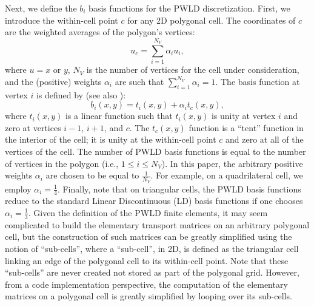 \documentclass[preprint,10pt]{elsarticle}
\renewcommand{\(}{\left(}
\renewcommand{\)}{\right)}
\renewcommand{\[}{\left[}
\renewcommand{\]}{\right]}
\newcommand{\tf}{b_i}
\begin{document}
Next, we define the $\tf$ basis functions for the PWLD discretization. First, we
introduce the within-cell point $c$ for any 2D polygonal cell. The coordinates 
of $c$ are the weighted averages of the polygon's vertices:
\begin{equation}
  u_c = \sum_{i=1}^{N_V} \alpha_i u_i,
\end{equation}
where $u=x$ or $y$, $N_V$ is the number of vertices for the cell under
consideration, and the (positive) weights $\alpha_i$ are such that $\sum_{i=1}^{N_V} \alpha_i =1$. 
The basis function at vertex $i$ is defined by 
(see also \cite{pwld_2d}):
\begin{equation}
  b_i(x,y) = t_i(x,y) + \alpha_i t_c(x,y),
\end{equation}
where $t_i(x,y)$ is a linear function such that $t_i(x,y)$ is unity at vertex
$i$ and zero at vertices $i-1$, $i+1$, and $c$. The $t_c(x,y)$ function is a ``tent''
function in the interior of the cell; it is unity at the within-cell point $c$
and zero at all of the vertices of the cell. The number of PWLD basis functions is 
equal to the number of vertices in the polygon (i.e., $1 \le i \le N_V$). In this paper, the arbitrary
positive weights $\alpha_i$ are chosen to be equal to $\frac{1}{N_V}$. For example, on a
quadrilateral cell, we employ $\alpha_i =\frac{1}{4}$. Finally, note that on
triangular cells, the PWLD basis functions reduce to the
standard Linear Discontinuous (LD) basis functions if one chooses $\alpha_i = \frac{1}{3}$. 
Given the definition of the PWLD
finite elements, it may seem complicated to build the elementary transport 
matrices on an arbitrary polygonal cell, but the construction of such matrices
can be greatly simplified using the notion of ``sub-cells'', where a ``sub-cell'',
in 2D, is defined as the triangular cell linking an edge of the polygonal cell to its
within-cell point. Note that these ``sub-cells'' are never created not stored as part of the 
polygonal grid. However, from a code implementation perspective, the computation of
the elementary matrices on a polygonal cell is greatly simplified by looping over its sub-cells. 


\end{document}
